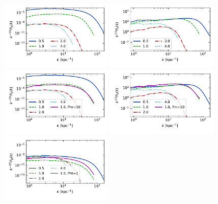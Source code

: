 \documentclass[preprint2]{aastex63}
\begin{document}
\begin{figure}
\includegraphics[trim=0 1.2cm 0 0.2cm,clip=True,width=0.48\textwidth]{figs/nu0_Bpower.pdf}
\includegraphics[trim=0 1.2cm 0 0.2cm,clip=True,width=0.48\textwidth]{figs/nu0_kpower.pdf}\\
\includegraphics[trim=0 1.2cm 0 0.2cm,clip=True,width=0.48\textwidth]{figs/nu1_Bpower.pdf}
\includegraphics[trim=0 1.2cm 0 0.2cm,clip=True,width=0.48\textwidth]{figs/nu1_kpower.pdf}\\
\includegraphics[trim=0 1.2cm 0 0.2cm,clip=True,width=0.48\textwidth]{figs/nu10_Bpower.pdf}

\end{figure}
\end{document}
